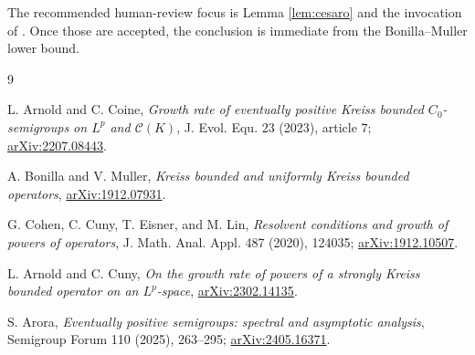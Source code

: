 \documentclass[11pt]{article}
\begin{document}
The recommended human-review focus is Lemma \ref{lem:cesaro} and the invocation
of \cite[Proposition 2.6]{ArnoldCoine}.  Once those are accepted, the conclusion
is immediate from the Bonilla--Muller lower bound.

\begin{thebibliography}{9}

L. Arnold and C. Coine,
\emph{Growth rate of eventually positive Kreiss bounded $C_0$-semigroups on
$L^p$ and $\mathcal C(K)$},
J. Evol. Equ. 23 (2023), article 7;
\href{https://arxiv.org/abs/2207.08443}{arXiv:2207.08443}.

A. Bonilla and V. Muller,
\emph{Kreiss bounded and uniformly Kreiss bounded operators},
\href{https://arxiv.org/abs/1912.07931}{arXiv:1912.07931}.

G. Cohen, C. Cuny, T. Eisner, and M. Lin,
\emph{Resolvent conditions and growth of powers of operators},
J. Math. Anal. Appl. 487 (2020), 124035;
\href{https://arxiv.org/abs/1912.10507}{arXiv:1912.10507}.

L. Arnold and C. Cuny,
\emph{On the growth rate of powers of a strongly Kreiss bounded operator on
an $L^p$-space},
\href{https://arxiv.org/abs/2302.14135}{arXiv:2302.14135}.

S. Arora,
\emph{Eventually positive semigroups: spectral and asymptotic analysis},
Semigroup Forum 110 (2025), 263--295;
\href{https://arxiv.org/abs/2405.16371}{arXiv:2405.16371}.

\end{thebibliography}
\end{document}
